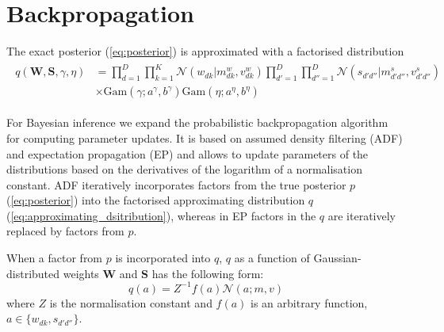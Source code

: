 \documentclass{article}
\begin{document}

%


\section{Backpropagation}
\label{sec:backpropagation}

The exact posterior (\ref{eq:posterior}) is approximated with a factorised distribution
\begin{align}
\label{eq:approximating_dsitribution}
\begin{split}
q(\mathbf{W}, \mathbf{S}, \gamma, \eta) &= \prod_{d=1}^D\prod_{k=1}^K \mathcal{N}(w_{dk} | m^w_{dk}, v^w_{dk}) \prod_{d'=1}^D\prod_{d''=1}^D \mathcal{N}(s_{d'd''} | m^s_{d'd''}, v^s_{d'd''}) \\
&\times \text{Gam}(\gamma; a^\gamma, b^\gamma) \text{Gam}(\eta; a^\eta, b^\eta)
\end{split}
\end{align}

For Bayesian inference we expand the probabilistic backpropagation algorithm~\citep{hernandez2015probabilistic} for computing parameter updates. It is based on assumed density filtering (ADF) and expectation propagation (EP) and allows to update parameters of the distributions based on the derivatives of the logarithm of a normalisation constant. ADF iteratively incorporates factors from the true posterior $p$ (\ref{eq:posterior}) into the factorised approximating distribution $q$ (\ref{eq:approximating_dsitribution}), whereas in EP factors in the $q$ are iteratively replaced by factors from $p$.

When a factor from $p$ is incorporated into $q$, $q$ as a function of Gaussian-distributed weights $\mathbf{W}$ and $\mathbf{S}$ has the following form:
\begin{equation}
q(a) = Z^{-1}f(a)\mathcal{N}(a; m, v)
\end{equation}
where $Z$ is the normalisation constant and $f(a)$ is an arbitrary function, $a \in \{w_{dk}, s_{d'd''}\}$.
\end{document}
